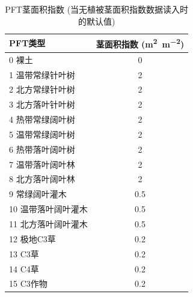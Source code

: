 \begin{table}[htbp]
    \centering
    \caption[PFT茎面积指数]{PFT茎面积指数 (当无植被茎面积指数数据读入时的默认值)}
    \label{tab:PFT茎面积指数}
    \begin{tabular}{@{}lc@{}}
    \toprule
    PFT类型       & 茎面积指数 (\unit{m^2.m^{-2}}) \\ \midrule
    0 裸土        & 0              \\
    1 温带常绿针叶树   & 2              \\
    2 北方常绿针叶树   & 2              \\
    3 北方落叶针叶树   & 2              \\
    4 热带常绿阔叶树   & 2              \\
    5 温带常绿阔叶树   & 2              \\
    6 热带落叶阔叶树   & 2              \\
    7 温带落叶阔叶林   & 2              \\
    8 北方落叶阔叶林   & 2              \\
    9 常绿阔叶灌木    & 0.5            \\
    10 温带落叶阔叶灌木 & 0.5            \\
    11 北方落叶阔叶灌木 & 0.5            \\
    12 极地C3草    & 0.2            \\
    13 C3草      & 0.2            \\
    14 C4草      & 0.2            \\
    15 C3作物     & 0.2            \\ \bottomrule
    \end{tabular}
\end{table}


